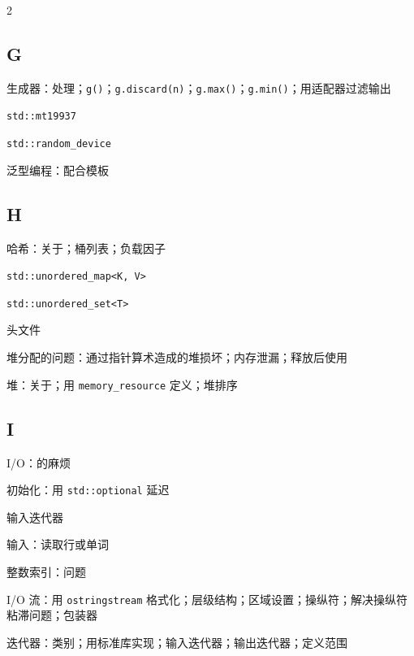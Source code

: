 \begin{multicols}{2}
\subsection*{G}

\noindent 生成器：处理；\texttt{g(\allowbreak{})\allowbreak{}}；\texttt{g.\allowbreak{}discard(\allowbreak{}n)\allowbreak{}}；\texttt{g.\allowbreak{}max(\allowbreak{})\allowbreak{}}；\texttt{g.\allowbreak{}min(\allowbreak{})\allowbreak{}}；用适配器过滤输出\par
\noindent \texttt{std::\allowbreak{}mt19937}\par
\noindent \texttt{std::\allowbreak{}random\_\allowbreak{}device}\par
\noindent 泛型编程：配合模板\par

\subsection*{H}

\noindent 哈希：关于；桶列表；负载因子\par
\noindent \texttt{std::\allowbreak{}unordered\_\allowbreak{}map<\allowbreak{}K,\allowbreak{} V>\allowbreak{}}\par
\noindent \texttt{std::\allowbreak{}unordered\_\allowbreak{}set<\allowbreak{}T>\allowbreak{}}\par
\noindent 头文件\par
\noindent 堆分配的问题：通过指针算术造成的堆损坏；内存泄漏；释放后使用\par
\noindent 堆：关于；用 \texttt{memory\_\allowbreak{}resource} 定义；堆排序\par

\subsection*{I}

\noindent I/O：的麻烦\par
\noindent 初始化：用 \texttt{std::\allowbreak{}optional} 延迟\par
\noindent 输入迭代器\par
\noindent 输入：读取行或单词\par
\noindent 整数索引：问题\par
\noindent I/O 流：用 \texttt{ostringstream} 格式化；层级结构；区域设置；操纵符；解决操纵符粘滞问题；包装器\par
\noindent 迭代器：类别；用标准库实现；输入迭代器；输出迭代器；定义范围\par


\end{multicols}
